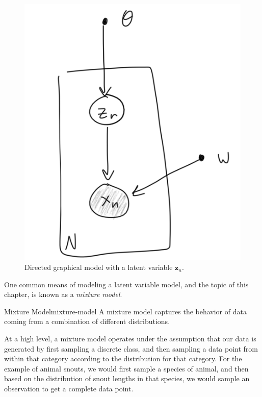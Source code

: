 \begin{figure}
    \centering
    \includegraphics[width=0.3\paperwidth]{../MixtureModels/fig/latent-variable-dgm.png}
    \caption{Directed graphical model with a latent variable $\textbf{z}_n$.}
    \label{fig:lvm-dgm}
\end{figure}

One common means of modeling a latent variable model, and the topic of this chapter, is known as a \textit{mixture model}.

\begin{definition}{Mixture Model}{mixture-model}
    A mixture model captures the behavior of data coming from a combination of different distributions.
\end{definition}

At a high level, a mixture model operates under the assumption that our data is generated by first sampling a discrete class, and then sampling a data point from within that category according to the distribution for that category. For the example of animal snouts, we would first sample a species of animal, and then based on the distribution of snout lengths in that species, we would sample an observation to get a complete data point.

